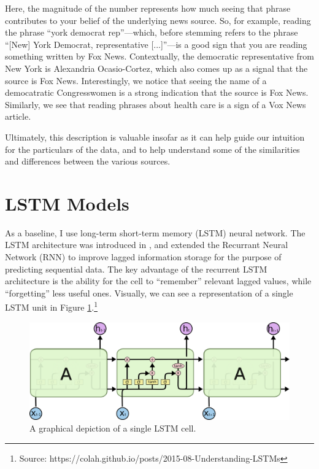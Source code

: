 \documentclass{article}
\begin{document}
		Here, the magnitude of the number represents how much seeing that phrase contributes to your belief of the underlying news source. So, for example, reading the phrase ``york democrat rep''---which, before stemming refers to the phrase ``[New] York Democrat, representative [...]''---is a good sign that you are reading something written by Fox News. Contextually, the democratic representative from New York is Alexandria Ocasio-Cortez, which also comes up as a signal that the source is Fox News. Interestingly, we notice that seeing the name of a democatratic Congresswomen is a  strong indication that the source is Fox News. Similarly, we see that reading phrases about health care is a sign of a Vox News article. 
		
		Ultimately, this description is valuable insofar as it can help guide our intuition for the particulars of the data, and to help understand some of the similarities and differences between the various sources. 
	
	    	
	\section{LSTM Models}
	As a baseline, I use long-term short-term memory (LSTM) neural network. The LSTM architecture was introduced in \citet{hochreiter1997long}, and extended the Recurrant Neural Network (RNN) to improve lagged information storage for the purpose of predicting sequential data. The key advantage of the recurrent LSTM architecture is the ability for the cell to ``remember'' relevant lagged values, while ``forgetting'' less useful ones. Visually, we can see a representation of a single LSTM unit in Figure \ref{fig:lstm}.\footnote{Source: https://colah.github.io/posts/2015-08-Understanding-LSTMs}
	
	\begin{figure}[H]
		\includegraphics[width=\textwidth]{figures/images/lstm-math.png}
		\caption{A graphical depiction of a single LSTM cell.}
		\label{fig:lstm}
	\end{figure}
\end{document}
